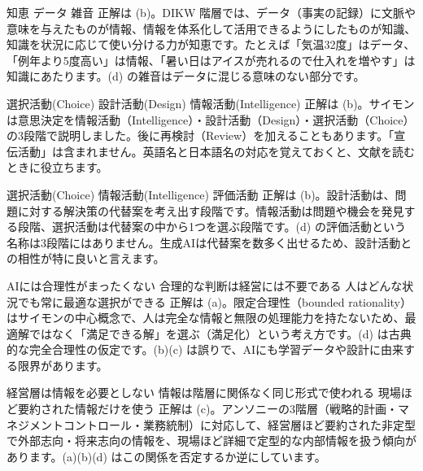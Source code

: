 
%
  {知恵}%
  {}%
  {データ}%
  {雑音}%
  {正解は (b)。DIKW 階層では、データ（事実の記録）に文脈や意味を与えたものが情報、情報を体系化して活用できるようにしたものが知識、知識を状況に応じて使い分ける力が知恵です。たとえば「気温32度」はデータ、「例年より5度高い」は情報、「暑い日はアイスが売れるので仕入れを増やす」は知識にあたります。(d) の雑音はデータに混じる意味のない部分です。}

%
  {選択活動(Choice)}%
  {}%
  {設計活動(Design)}%
  {情報活動(Intelligence)}%
  {正解は (b)。サイモンは意思決定を情報活動（Intelligence）・設計活動（Design）・選択活動（Choice）の3段階で説明しました。後に再検討（Review）を加えることもあります。「宣伝活動」は含まれません。英語名と日本語名の対応を覚えておくと、文献を読むときに役立ちます。}

%
  {選択活動(Choice)}%
  {}%
  {情報活動(Intelligence)}%
  {評価活動}%
  {正解は (b)。設計活動は、問題に対する解決策の代替案を考え出す段階です。情報活動は問題や機会を発見する段階、選択活動は代替案の中から1つを選ぶ段階です。(d) の評価活動という名称は3段階にはありません。生成AIは代替案を数多く出せるため、設計活動との相性が特に良いと言えます。}

%
  {}%
  {AIには合理性がまったくない}%
  {合理的な判断は経営には不要である}%
  {人はどんな状況でも常に最適な選択ができる}%
  {正解は (a)。限定合理性（bounded rationality）はサイモンの中心概念で、人は完全な情報と無限の処理能力を持たないため、最適解ではなく「満足できる解」を選ぶ（満足化）という考え方です。(d) は古典的な完全合理性の仮定です。(b)(c) は誤りで、AIにも学習データや設計に由来する限界があります。}

%
  {経営層は情報を必要としない}%
  {情報は階層に関係なく同じ形式で使われる}%
  {}%
  {現場ほど要約された情報だけを使う}%
  {正解は (c)。アンソニーの3階層（戦略的計画・マネジメントコントロール・業務統制）に対応して、経営層ほど要約された非定型で外部志向・将来志向の情報を、現場ほど詳細で定型的な内部情報を扱う傾向があります。(a)(b)(d) はこの関係を否定するか逆にしています。}
